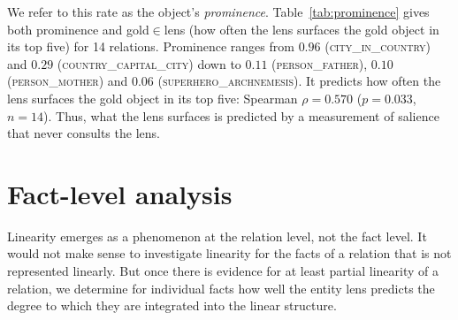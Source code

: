 \documentclass{article}
\begin{document}



We refer to this rate as the object's \emph{prominence}.
Table~\ref{tab:prominence} gives both prominence and
gold$\in$lens
(how often the lens surfaces the
gold object in its top five)
for 14 relations.
Prominence
ranges from $0.96$
(\textsc{city\_in\_country}) and $0.29$ (\textsc{country\_capital\_city})
down to $0.11$ (\textsc{person\_father}), $0.10$
(\textsc{person\_mother}) and $0.06$
(\textsc{superhero\_archnemesis}). It predicts how often the lens surfaces the
gold object in its top five: Spearman $\rho = 0.570$ ($p = 0.033$,
$n = 14$).
Thus, what the lens surfaces is predicted by a measurement of
salience that never consults the lens.








\section{Fact-level analysis}
\label{sec:subject}
Linearity emerges as a phenomenon at the relation level, not
the fact level. It would not make sense to investigate
linearity for the facts of a relation that is not
represented linearly. But
once there is evidence for at least partial linearity of a
relation, we determine for individual facts how well
the entity lens predicts the degree to which
they are
integrated into the linear structure.
\end{document}
